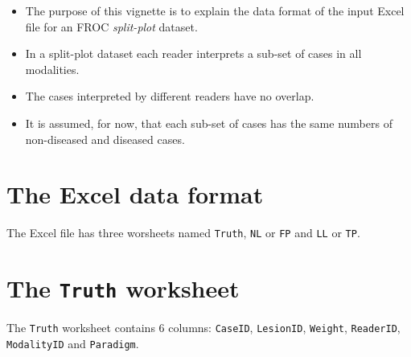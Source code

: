 \documentclass[
]{book}
\providecommand{\tightlist}{%
  \setlength{\itemsep}{0pt}\setlength{\parskip}{0pt}}
\begin{document}
\begin{itemize}
\tightlist
\item
  The purpose of this vignette is to explain the data format of the input Excel file for an FROC \emph{split-plot} dataset.
\item
  In a split-plot dataset each reader interprets a sub-set of cases in all modalities.
\item
  The cases interpreted by different readers have no overlap.
\item
  It is assumed, for now, that each sub-set of cases has the same numbers of non-diseased and diseased cases.
\end{itemize}

\hypertarget{the-excel-data-format-3}{%
\section{The Excel data format}\label{the-excel-data-format-3}}

The Excel file has three worsheets named \texttt{Truth}, \texttt{NL} or \texttt{FP} and \texttt{LL} or \texttt{TP}.

\hypertarget{the-truth-worksheet-3}{%
\section{\texorpdfstring{The \texttt{Truth} worksheet}{The Truth worksheet}}\label{the-truth-worksheet-3}}

The \texttt{Truth} worksheet contains 6 columns: \texttt{CaseID}, \texttt{LesionID}, \texttt{Weight}, \texttt{ReaderID}, \texttt{ModalityID} and \texttt{Paradigm}.
\end{document}
